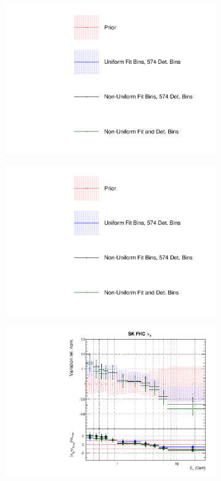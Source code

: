 \begin{figure}
\centering
\begin{subfigure}{0.3\textwidth}
  \centering
  \includegraphics[width=1.0\linewidth,  trim={5mm  80mm 0mm 0mm}, clip]{figs/polyasmvs_leg}
\end{subfigure}
\begin{subfigure}{0.3\textwidth}
  \centering
  \includegraphics[width=1.0\linewidth,  trim={5mm  0mm 0mm 95mm}, clip]{figs/polyasmvs_leg}
\end{subfigure}
\begin{subfigure}{0.45\textwidth}
  \centering
  \includegraphics[width=0.75\linewidth]{figs/polydataflux_8}

\end{subfigure}
\end{figure}

